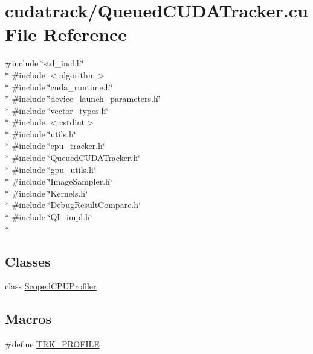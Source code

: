 \hypertarget{_queued_c_u_d_a_tracker_8cu}{}\section{cudatrack/\+Queued\+C\+U\+D\+A\+Tracker.cu File Reference}
\label{_queued_c_u_d_a_tracker_8cu}
{\ttfamily \#include \char`\"{}std\+\_\+incl.\+h\char`\"{}}\\*
{\ttfamily \#include $<$algorithm$>$}\\*
{\ttfamily \#include \char`\"{}cuda\+\_\+runtime.\+h\char`\"{}}\\*
{\ttfamily \#include \char`\"{}device\+\_\+launch\+\_\+parameters.\+h\char`\"{}}\\*
{\ttfamily \#include \char`\"{}vector\+\_\+types.\+h\char`\"{}}\\*
{\ttfamily \#include $<$cstdint$>$}\\*
{\ttfamily \#include \char`\"{}utils.\+h\char`\"{}}\\*
{\ttfamily \#include \char`\"{}cpu\+\_\+tracker.\+h\char`\"{}}\\*
{\ttfamily \#include \char`\"{}Queued\+C\+U\+D\+A\+Tracker.\+h\char`\"{}}\\*
{\ttfamily \#include \char`\"{}gpu\+\_\+utils.\+h\char`\"{}}\\*
{\ttfamily \#include \char`\"{}Image\+Sampler.\+h\char`\"{}}\\*
{\ttfamily \#include \char`\"{}Kernels.\+h\char`\"{}}\\*
{\ttfamily \#include \char`\"{}Debug\+Result\+Compare.\+h\char`\"{}}\\*
{\ttfamily \#include \char`\"{}Q\+I\+\_\+impl.\+h\char`\"{}}\\*
\subsection*{Classes}
\begin{DoxyCompactItemize}
\item 
class \hyperlink{class_scoped_c_p_u_profiler}{Scoped\+C\+P\+U\+Profiler}
\end{DoxyCompactItemize}
\subsection*{Macros}
\begin{DoxyCompactItemize}
\item 
\#define \hyperlink{_queued_c_u_d_a_tracker_8cu_af56066d48cd335420540dfaad1b7bbc9}{T\+R\+K\+\_\+\+P\+R\+O\+F\+I\+LE}
\end{DoxyCompactItemize}
